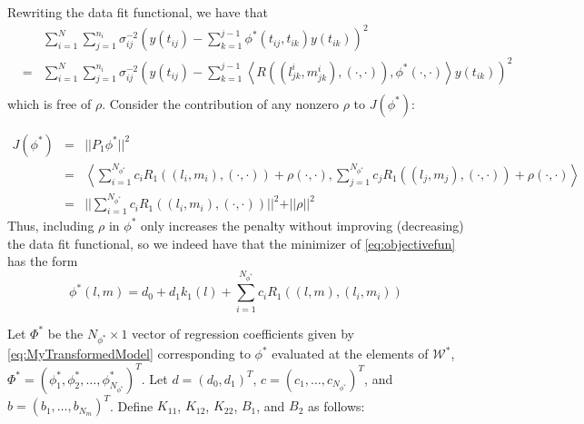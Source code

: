 \documentclass[12pt]{article}
\theoremstyle{definition}
\begin{document}
Rewriting the data fit functional, we have that  
 \begin{eqnarray*}
&\mbox{ }&\sum_{i=1}^N \sum_{j=1}^{n_i} \sigma_{ij}^{-2} \left(y\left(t_{ij}\right) - \sum_{k=1}^{j-1} \phi^*\left(t_{ij}, t_{ik}  \right) y\left(t_{ik}\right)  \right)^2  \\ 
&=& \sum_{i=1}^N \sum_{j=1}^{n_i} \sigma_{ij}^{-2} \left(y\left(t_{ij}\right) - \sum_{k=1}^{j-1} \left< R\left(\left(l^i_{jk},m^i_{jk}\right),\left(\cdot,\cdot\right) \right),\phi^*\left(\cdot,\cdot\right)\right> y\left(t_{ik}\right)  \right)^2  \\
 \end{eqnarray*}
\noindent
which is free of $\rho$. Consider the contribution of any nonzero $\rho$ to $J\left(\phi^*\right)$: 
  
 \begin{eqnarray*}
 J\left(\phi^*\right) &=& \vert \vert  P_1\phi^* \vert \vert^2\\
 &=& \left< \sum_{i=1}^{N_{\phi^*}}  c_i R_1\left( \left(l_i,m_i\right),\left(\cdot,\cdot\right) \right) + \rho\left(\cdot,\cdot \right), \sum_{j=1}^{N_{\phi^*}} c_j R_1\left( \left(l_j,m_j\right),\left(\cdot,\cdot\right) \right) + \rho\left(\cdot,\cdot\right)\right> \\
 &=& \vert \vert \sum_{i=1}^{N_{\phi^*}}  c_i R_1\left(\left(l_i,m_i\right),\left(\cdot,\cdot\right) \right) \vert \vert^2 + \vert \vert  \rho \vert \vert^2 
 \end{eqnarray*}
\noindent
Thus, including $\rho$ in $\phi^*$ only increases the penalty without improving (decreasing) the data fit functional, so we indeed have that the minimizer of \eqref{eq:objectivefun} has the form
\begin{equation}
 \phi^*\left(l,m\right) =  d_0 + d_1k_1\left(l\right) + \sum_{i=1}^{N_{\phi^*}} c_i R_1\left( \left(l,m\right) , \left(l_i,m_i \right)\right)
 \label{eq:finitedimsolution}
 \end{equation}

Let $\Phi^*$ be the $N_{\phi^*} \times 1$ vector of regression coefficients given by \eqref{eq:MyTransformedModel} corresponding to $\phi^*$ evaluated at the elements of $\mathcal{W}^*$, $\Phi^* = \left(\phi^*_1,\phi^*_2, \dots, \phi^*_{N_{\phi^*}}  \right)^T$. Let $d = \left(d_0, d_1\right)^T$, $c = \left(c_1, \dots, c_{N_{\phi^*}}  \right)^T$, and $b = \left(b_1, \dots, b_{N_m}  \right)^T$.   Define $K_{11}$, $K_{12}$, $K_{22}$, $B_{1}$, and $B_2$ as follows: 
\end{document}
